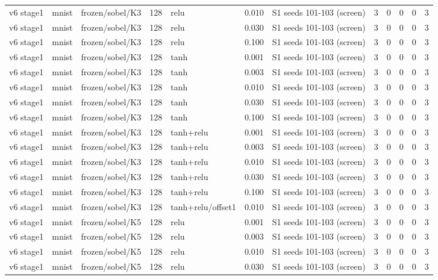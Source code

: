 \begin{table}[htbp]
{\begin{tabular}{@{}lllrlrlrrrrr@{}}
v6 stage1 & mnist & frozen/sobel/K3 & 128 & relu & 0.010 & S1 seeds 101-103 (screen) & 3 & 0 & 0 & 0 & 3 \\
v6 stage1 & mnist & frozen/sobel/K3 & 128 & relu & 0.030 & S1 seeds 101-103 (screen) & 3 & 0 & 0 & 0 & 3 \\
v6 stage1 & mnist & frozen/sobel/K3 & 128 & relu & 0.100 & S1 seeds 101-103 (screen) & 3 & 0 & 0 & 0 & 3 \\
v6 stage1 & mnist & frozen/sobel/K3 & 128 & tanh & 0.001 & S1 seeds 101-103 (screen) & 3 & 0 & 0 & 0 & 3 \\
v6 stage1 & mnist & frozen/sobel/K3 & 128 & tanh & 0.003 & S1 seeds 101-103 (screen) & 3 & 0 & 0 & 0 & 3 \\
v6 stage1 & mnist & frozen/sobel/K3 & 128 & tanh & 0.010 & S1 seeds 101-103 (screen) & 3 & 0 & 0 & 0 & 3 \\
v6 stage1 & mnist & frozen/sobel/K3 & 128 & tanh & 0.030 & S1 seeds 101-103 (screen) & 3 & 0 & 0 & 0 & 3 \\
v6 stage1 & mnist & frozen/sobel/K3 & 128 & tanh & 0.100 & S1 seeds 101-103 (screen) & 3 & 0 & 0 & 0 & 3 \\
v6 stage1 & mnist & frozen/sobel/K3 & 128 & tanh+relu & 0.001 & S1 seeds 101-103 (screen) & 3 & 0 & 0 & 0 & 3 \\
v6 stage1 & mnist & frozen/sobel/K3 & 128 & tanh+relu & 0.003 & S1 seeds 101-103 (screen) & 3 & 0 & 0 & 0 & 3 \\
v6 stage1 & mnist & frozen/sobel/K3 & 128 & tanh+relu & 0.010 & S1 seeds 101-103 (screen) & 3 & 0 & 0 & 0 & 3 \\
v6 stage1 & mnist & frozen/sobel/K3 & 128 & tanh+relu & 0.030 & S1 seeds 101-103 (screen) & 3 & 0 & 0 & 0 & 3 \\
v6 stage1 & mnist & frozen/sobel/K3 & 128 & tanh+relu & 0.100 & S1 seeds 101-103 (screen) & 3 & 0 & 0 & 0 & 3 \\
v6 stage1 & mnist & frozen/sobel/K3 & 128 & tanh+relu/offset1 & 0.010 & S1 seeds 101-103 (screen) & 3 & 0 & 0 & 0 & 3 \\
v6 stage1 & mnist & frozen/sobel/K5 & 128 & relu & 0.001 & S1 seeds 101-103 (screen) & 3 & 0 & 0 & 0 & 3 \\
v6 stage1 & mnist & frozen/sobel/K5 & 128 & relu & 0.003 & S1 seeds 101-103 (screen) & 3 & 0 & 0 & 0 & 3 \\
v6 stage1 & mnist & frozen/sobel/K5 & 128 & relu & 0.010 & S1 seeds 101-103 (screen) & 3 & 0 & 0 & 0 & 3 \\
v6 stage1 & mnist & frozen/sobel/K5 & 128 & relu & 0.030 & S1 seeds 101-103 (screen) & 3 & 0 & 0 & 0 & 3 \\

\end{tabular}}
\end{table}
